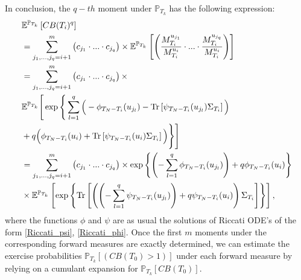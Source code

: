 In conclusion, the $q-th$ moment under $\mathbb{P}_{T_k}$ has the following expression:
\begin{align}
&\mathbb{E}^{\mathbb{P}_{T_{k}}}\left[CB(T_{i})^q \right]\nonumber\\
&=\sum_{j_{1},...,j_{q}=i+1}^{m}\left(c_{j_{1}}\cdot...\cdot c_{j_{q}} \right)\times{\mathbb{E}^{\mathbb{P}_{T_{k}}}\left[\left(\frac{M^{u_{j_{1}}}_{T_{i}}}{M^{u_i}_{T_{i}}}\cdot...\cdot \frac{M^{u_{j_{q}}}_{T_{i}}}{M^{u_i}_{T_{i}}} \right) \right]}\nonumber\\
&=\sum_{j_{1},...,j_{q}=i+1}^{m}\left(c_{j_{1}}\cdot...\cdot c_{j_{q}} \right)\times\nonumber\\
&\mathbb{E}^{\mathbb{P}_{T_{k}}}\Bigg[\exp\Bigg\{ \sum_{l=1}^{q}{\Big(-\phi_{T_{N}-T_{i}}(u_{j_{l}})-\textup{Tr}\left[ \psi_{T_{N}-T_{i}}(u_{j_{l}})\Sigma_{T_{i}}\right]\Big)}\Bigg. \nonumber\\
&\Bigg.+q\Big( \phi_{T_{N}-T_{i}}(u_{i})+\textup{Tr}\left[ \psi_{T_{N}-T_{i}}(u_{i})\Sigma_{T_{i}}\right]\Big)\Bigg\}\Bigg]\nonumber\\
&=\sum_{j_{1},...,j_{q}=i+1}^{m}\left(c_{j_{1}}\cdot...\cdot c_{j_{q}} \right)\times \exp \left\{\left(-\sum_{l=1}^{q}{\phi_{T_{N}-T_{i}}(u_{j_{l}})}\right)+q\phi_{T_{N}-T_{i}}(u_{i}) \right\}\nonumber\\
&\times \mathbb{E}^{\mathbb{P}_{T_{k}}}\left[\exp\left\{\textup{Tr}\left[\left(\left(-\sum_{l=1}^{q}{\psi_{T_{N}-T_{i}}(u_{j_{l}})}\right)+q\psi_{T_{N}-T_{i}}(u_{i})\right)\Sigma_{T_{i}} \right] \right\} \right],
\end{align}
where the functions $\phi$ and $\psi$ are as usual the solutions of Riccati ODE's of the form \eqref{Riccati_psi}, \eqref{Riccati_phi}. Once the first $m$ moments under the corresponding forward measures are exactly determined, we can estimate the exercise probabilities $\mathbb{P}_{T_{k}}\left[\left(CB(T_{0})>1\right)\right]$ under each forward measure by relying on a cumulant expansion for $\mathbb{P}_{T_{k}}\left[CB(T_{0})\right]$.
